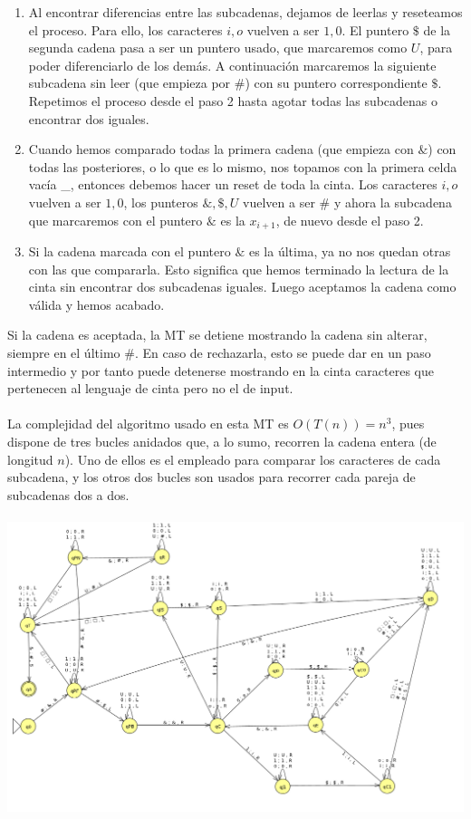 \documentclass[11pt, a4paper]{exam}
\begin{document}
\begin{questions}
\begin{parts}
\begin{solution}
\begin{enumerate}
                \item Al encontrar diferencias entre las subcadenas, dejamos de leerlas y reseteamos el proceso. Para ello, los caracteres $i,o$ vuelven a ser $1,0$. El puntero $\$$ de la segunda cadena pasa a ser un puntero usado, que marcaremos como $U$, para poder diferenciarlo de los demás. A continuación marcaremos la siguiente subcadena sin leer (que empieza por $\#$) con su puntero correspondiente $\$$. Repetimos el proceso desde el paso 2 hasta agotar todas las subcadenas o encontrar dos iguales.
                \item Cuando hemos comparado todas la primera cadena (que empieza con $\&$) con todas las posteriores, o lo que es lo mismo, nos topamos con la primera celda vacía \_, entonces debemos hacer un reset de toda la cinta. Los caracteres $i,o$ vuelven a ser $1,0$, los punteros $\&,\$,U$ vuelven a ser $\#$ y ahora la subcadena que marcaremos con el puntero $\&$ es la $x_{i+1}$, de nuevo desde el paso 2.
                \item Si la cadena marcada con el puntero $\&$ es la última, ya no nos quedan otras con las que compararla. Esto significa que hemos terminado la lectura de la cinta sin encontrar dos subcadenas iguales. Luego aceptamos la cadena como válida y hemos acabado.
            \end{enumerate}
            Si la cadena es aceptada, la MT se detiene mostrando la cadena sin alterar, siempre en el último $\#$. En caso de rechazarla, esto se puede dar en un paso intermedio y por tanto puede detenerse mostrando en la cinta caracteres que pertenecen al lenguaje de cinta pero no el de input.
            \\
            \\
            La complejidad del algoritmo usado en esta MT es $O(T(n)) = n^3$, pues dispone de tres bucles anidados que, a lo sumo, recorren la cadena entera (de longitud $n$). Uno de ellos es el empleado para comparar los caracteres de cada subcadena, y los otros dos bucles son usados para recorrer cada pareja de subcadenas dos a dos.
            \\
            \\
            \includegraphics[width = 15 cm]{figs/M4Unicinta.png}

\end{solution}
\end{parts}
\end{questions}
\end{document}
